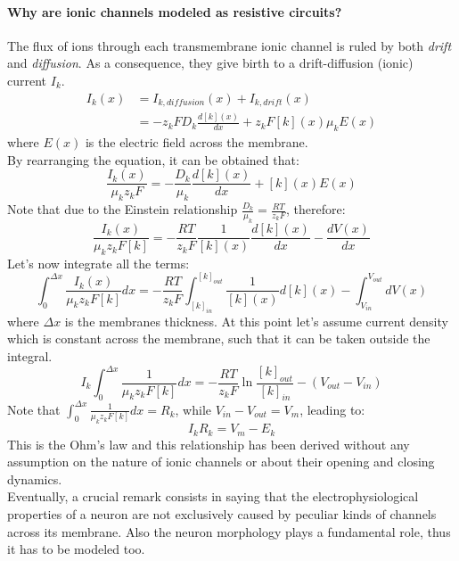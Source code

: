 \paragraph{Why are ionic channels modeled as resistive circuits?} The flux of ions through each
transmembrane ionic channel is ruled by both \textit{drift} and \textit{diffusion}. As a
consequence, they give birth to a drift-diffusion (ionic) current \(I_{k}\).
\begin{align*}
    I_{k}(x)
     & =I_{k,diffusion}(x)+I_{k,drift}(x)                      \\
     & =-z_{k}FD_{k}\frac{d[k](x)}{dx}+z_{k}F[k](x)\mu_{k}E(x)
\end{align*}
where \(E(x)\) is the electric field across the membrane.\\
By rearranging the equation, it can be obtained that:
\begin{equation*}
    \frac{I_{k}(x)}{\mu_{k}z_{k}F}=-\frac{D_{k}}{\mu_{k}}\frac{d[k](x)}{dx}+[k](x)E(x)
\end{equation*}
Note that due to the Einstein relationship \(\frac{D_{k}}{\mu_{k}}=\frac{RT}{z_{k}F}\), therefore:
\begin{equation*}
    \frac{I_{k}(x)}{\mu_{k}z_{k}F[k]}=
    -\frac{RT}{z_{k}F}\frac{1}{[k](x)}\frac{d[k](x)}{dx}-\frac{dV(x)}{dx}
\end{equation*}
Let's now integrate all the terms:
\begin{equation*}
    \int_{0}^{\Delta{x}}{\frac{I_{k}(x)}{\mu_{k}z_{k}F[k]}}dx=
    -\frac{RT}{z_{k}F}\int_{[k]_{in}}^{[k]_{out}}{\frac{1}{[k](x)}d[k](x)}
    -\int_{V_{in}}^{V_{out}}{dV(x)}
\end{equation*}
where \(\Delta{x}\) is the membranes thickness. At this point let's assume current density which
is constant across the membrane, such that it can be taken outside the integral.
\begin{equation*}
    I_{k}\int_{0}^{\Delta{x}}{\frac{1}{\mu_{k}z_{k}F[k]}}dx=
    -\frac{RT}{z_{k}F}\ln{\frac{[k]_{out}}{[k]_{in}}}
    -(V_{out}-V_{in})
\end{equation*}
Note that \(\int_{0}^{\Delta{x}}{\frac{1}{\mu_{k}z_{k}F[k]}}dx=R_{k}\), while
\(V_{in}-V_{out}=V_{m}\), leading to:
\begin{equation*}
    I_{k}{R_{k}}=V_{m}-E_{k}
\end{equation*}
This is the Ohm's law and this relationship has been derived without any assumption on the nature
of ionic channels or about their opening and closing dynamics.\\
Eventually, a crucial remark consists in saying that the electrophysiological properties of a
neuron are not exclusively caused by peculiar kinds of channels across its membrane. Also the
neuron morphology plays a fundamental role, thus it has to be modeled too.